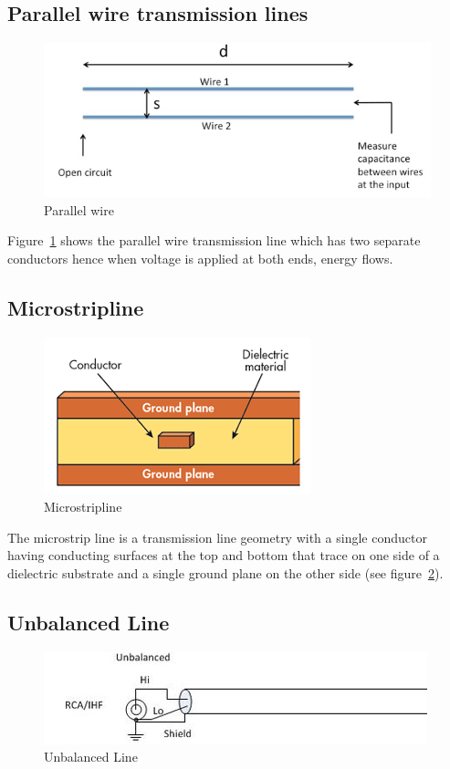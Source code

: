 \subsection{Parallel wire transmission lines}
\begin{figure}[h]
\centering
\includegraphics[scale=0.4]{./graphics/twowire}
\caption{Parallel wire}
\label{fig:twowire}
\end{figure}

Figure~\ref{fig:twowire} shows the parallel wire transmission line which has two separate conductors hence when voltage is applied at both ends, energy flows.

\subsection{Microstripline}
\begin{figure}[h]
\centering
\includegraphics[scale=0.7]{./graphics/micro}
\caption{Microstripline}
\label{fig:micro}
\end{figure}

The microstrip line is a transmission line geometry with a single conductor having conducting surfaces at the top and bottom that trace on one side of a dielectric substrate and a single ground plane on the other side (see figure~\ref{fig:micro}).

\subsection{Unbalanced Line}
\begin{figure}[h]
\centering
\includegraphics[width=1\linewidth]{./graphics/Unbalanced}
\caption{Unbalanced Line}
\label{fig:unbalanced}
\end{figure}

